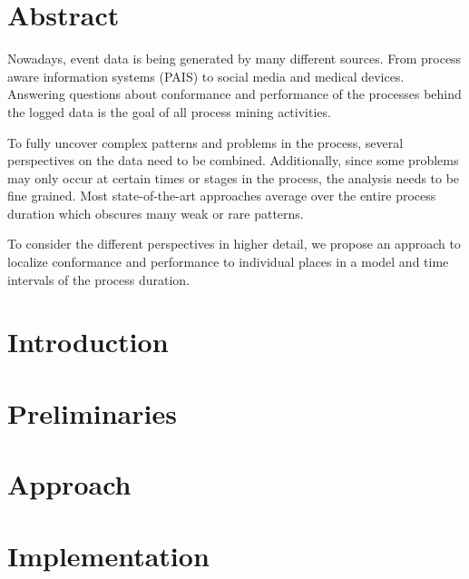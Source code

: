 \documentclass[a4paper,11pt,twoside,openright]{WCarticle}
\begin{document}

\tpage
\pagestyle{plain}





\chapter*{Abstract} 
Nowadays, event data is being generated by many different sources. From process aware information systems (PAIS) to social media and medical devices.
Answering questions about conformance and performance of the processes behind the logged data is the goal of all process mining activities.

To fully uncover complex patterns and problems in the process, several perspectives on the data need to be combined.
Additionally, since some problems may only occur at certain times or stages in the process, the analysis needs to be fine grained.
Most state-of-the-art approaches average over the entire process duration which obscures many weak or rare patterns.

To consider the different perspectives in higher detail, we propose an approach to localize conformance and performance to individual places in a model and time intervals of the process duration.

\tableofcontents


\cleardoublepage
\pagestyle{fancy}
\chapter{Introduction} \label{chap:intro}


\chapter{Preliminaries} \label{chap:prelim}


\chapter{Approach} \label{chap:appr}


\chapter{Implementation} \label{chap:impl}

\end{document}
